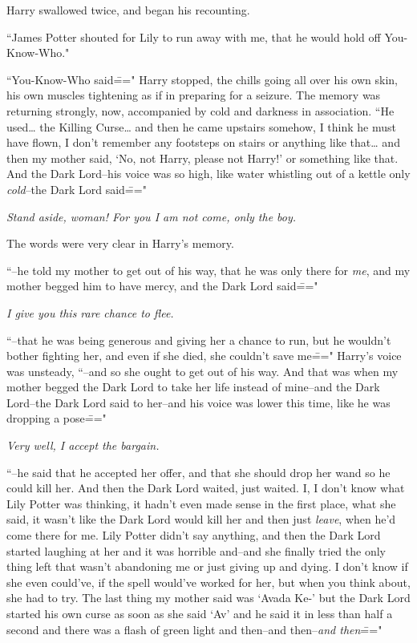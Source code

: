Harry swallowed twice, and began his recounting.

``James Potter shouted for Lily to run away with me, that he would hold off You-Know-Who."

``You-Know-Who said\===" Harry stopped, the chills going all over his own skin, his own muscles tightening as if in preparing for a seizure. The memory was returning strongly, now, accompanied by cold and darkness in association. ``He used{\ldots} the Killing Curse{\ldots} and then he came upstairs somehow, I think he must have flown, I don't remember any footsteps on stairs or anything like that{\ldots} and then my mother said, `No, not Harry, please not Harry!' or something like that. And the Dark Lord\---his voice was so high, like water whistling out of a kettle only \emph{cold}\---the Dark Lord said\==="

\emph{Stand aside, woman! For you I am not come, only the boy.}

The words were very clear in Harry's memory.

``\---he told my mother to get out of his way, that he was only there for \emph{me}, and my mother begged him to have mercy, and the Dark Lord said\==="

\emph{I give you this rare chance to flee.}

``\---that he was being generous and giving her a chance to run, but he wouldn't bother fighting her, and even if she died, she couldn't save me\===" Harry's voice was unsteady, ``\---and so she ought to get out of his way. And that was when my mother begged the Dark Lord to take her life instead of mine\---and the Dark Lord\---the Dark Lord said to her\---and his voice was lower this time, like he was dropping a pose\==="

\emph{Very well, I accept the bargain.}

``\---he said that he accepted her offer, and that she should drop her wand so he could kill her. And then the Dark Lord waited, just waited. I, I don't know what Lily Potter was thinking, it hadn't even made sense in the first place, what she said, it wasn't like the Dark Lord would kill her and then just \emph{leave}, when he'd come there for me. Lily Potter didn't say anything, and then the Dark Lord started laughing at her and it was horrible and\---and she finally tried the only thing left that wasn't abandoning me or just giving up and dying. I don't know if she even could've, if the spell would've worked for her, but when you think about, she had to try. The last thing my mother said was `Avada Ke-' but the Dark Lord started his own curse as soon as she said `Av' and he said it in less than half a second and there was a flash of green light and then\---and then\---\emph{and then}\==="


